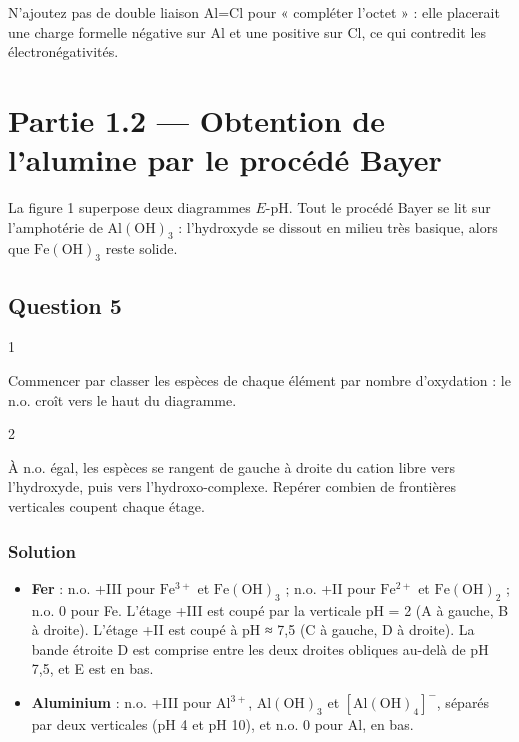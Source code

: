 \documentclass[11pt,a4paper]{article}
\providecommand{\tightlist}{\setlength{\itemsep}{0pt}\setlength{\parskip}{0pt}}
\begin{document}
\begin{piege}

N'ajoutez pas de double liaison Al=Cl pour « compléter l'octet » : elle placerait une charge formelle négative sur Al et une positive sur Cl, ce qui contredit les électronégativités.

\end{piege}

\hypertarget{partie-1.2-obtention-de-lalumine-par-le-procuxe9duxe9-bayer}{%
\section{Partie 1.2 --- Obtention de l'alumine par le procédé Bayer}\label{partie-1.2-obtention-de-lalumine-par-le-procuxe9duxe9-bayer}}

La figure 1 superpose deux diagrammes \(E\)-pH. Tout le procédé Bayer se lit sur l'amphotérie de \(\mathrm{Al(OH)_3}\) : l'hydroxyde se dissout en milieu très basique, alors que \(\mathrm{Fe(OH)_3}\) reste solide.

\hypertarget{question-5}{%
\subsection{Question 5}\label{question-5}}

\begin{indication}{1}

Commencer par classer les espèces de chaque élément par nombre d'oxydation : le n.o. croît vers le haut du diagramme.

\end{indication}

\begin{indication}{2}

À n.o. égal, les espèces se rangent de gauche à droite du cation libre vers l'hydroxyde, puis vers l'hydroxo-complexe. Repérer combien de frontières verticales coupent chaque étage.

\end{indication}

\hypertarget{solution-4}{%
\subsubsection{Solution}\label{solution-4}}

\begin{itemize}
\tightlist
\item
  \textbf{Fer} : n.o. +III pour \(\mathrm{Fe^{3+}}\) et \(\mathrm{Fe(OH)_3}\) ; n.o. +II pour \(\mathrm{Fe^{2+}}\) et \(\mathrm{Fe(OH)_2}\) ; n.o. 0 pour Fe. L'étage +III est coupé par la verticale pH = 2 (A à gauche, B à droite). L'étage +II est coupé à pH ≈ 7,5 (C à gauche, D à droite). La bande étroite D est comprise entre les deux droites obliques au-delà de pH 7,5, et E est en bas.
\item
  \textbf{Aluminium} : n.o. +III pour \(\mathrm{Al^{3+}}\), \(\mathrm{Al(OH)_3}\) et \([\mathrm{Al(OH)_4}]^-\), séparés par deux verticales (pH 4 et pH 10), et n.o. 0 pour Al, en bas.
\end{itemize}
\end{document}
